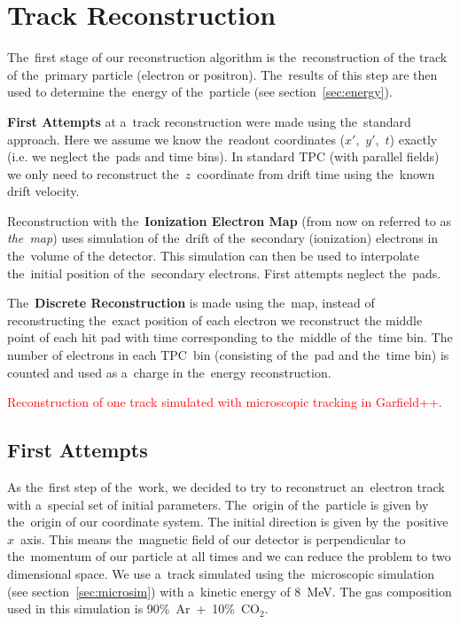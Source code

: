 \chapter{Track Reconstruction}
\label{sec:track}
	The~first stage of our reconstruction algorithm is the~reconstruction of the track of the~primary particle (electron or positron). The~results of this step are then used to determine the~energy of the~particle (see section~\ref{sec:energy}).
	
	\textbf{First Attempts} at a~track reconstruction were made using the~standard approach. Here we assume we know the~readout coordinates ($x'$,~$y'$,~$t$) exactly (i.e. we neglect the~pads and time bins). In standard \ac{TPC} (with parallel fields) we only need to reconstruct the~$z$~coordinate from drift time using the~known drift velocity.
	
	Reconstruction with the~\textbf{Ionization Electron Map} (from now on referred to as \emph{the~map}) uses simulation of the~drift of the~secondary (ionization) electrons in the~volume of the detector. This simulation can then be used to interpolate the~initial position of the~secondary electrons. First attempts neglect the~pads.
	
	The~\textbf{Discrete Reconstruction} is made using the~map, instead of reconstructing the~exact position of each electron we reconstruct the middle point of each hit pad with time corresponding to the~middle of the~time bin. The number of electrons in each \ac{TPC}~bin (consisting of the~pad and the~time bin) is counted and used as a~charge in the~energy reconstruction.
	
	\textcolor{red}{Reconstruction of one track simulated with microscopic tracking in Garfield++.}
	
	\section{First Attempts}
	\label{sec:trackfirst}
		As the~first step of the~work, we decided to try to reconstruct an~electron track with a~special set of initial parameters. The~origin of the~particle is given by the~origin of our coordinate system. The initial direction is given by the~positive $x$~axis. This means the~magnetic field of our detector is perpendicular to the~momentum of our particle at all times and we can reduce the problem to two dimensional space. We use a~track simulated using the~microscopic simulation (see section~\ref{sec:microsim}) with a~kinetic energy of 8~MeV. The gas composition used in this simulation is 90\%~Ar~+~10\%~CO$_2$.
		
